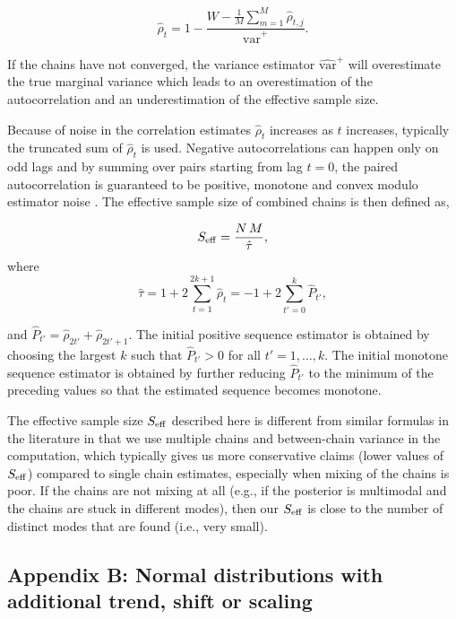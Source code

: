 \documentclass[american,]{article}
\theoremstyle{definition}
\begin{document}
\begin{equation}
\hat{\rho}_t
= 1 - \frac{\displaystyle W - \textstyle \frac{1}{M}\sum_{m=1}^M 
\hat{\rho}_{t,j}}{\widehat{\mbox{var}}^{+}}. \label{rhohat}
\end{equation}

If the chains have not converged, the variance estimator
\(\widehat{\mbox{var}}^{+}\) will overestimate the true marginal
variance which leads to an overestimation of the autocorrelation and an
underestimation of the effective sample size.

Because of noise in the correlation estimates \(\hat{\rho}_t\) increases
as \(t\) increases, typically the truncated sum of \(\hat{\rho}_t\) is
used. Negative autocorrelations can happen only on odd lags and by
summing over pairs starting from lag \(t=0\), the paired autocorrelation
is guaranteed to be positive, monotone and convex modulo estimator noise
\citep{Geyer:1992, Geyer:2011}. The effective sample size of combined
chains is then defined as,

\begin{equation}
S_{\rm eff} = \frac{N \, M}{\hat{\tau}},
\end{equation} where \begin{equation}
\hat{\tau} = 1 + 2 \sum_{t=1}^{2k+1} \hat{\rho}_t = 
-1 + 2 \sum_{t'=0}^{k} \hat{P}_{t'},
\end{equation}

and \(\hat{P}_{t'}=\hat{\rho}_{2t'}+\hat{\rho}_{2t'+1}\). The initial
positive sequence estimator is obtained by choosing the largest \(k\)
such that \(\hat{P}_{t'}>0\) for all \(t' = 1,\ldots,k\). The initial
monotone sequence estimator is obtained by further reducing
\(\hat{P}_{t'}\) to the minimum of the preceding values so that the
estimated sequence becomes monotone.

The effective sample size \(S_{\rm eff}\) described here is different
from similar formulas in the literature in that we use multiple chains
and between-chain variance in the computation, which typically gives us
more conservative claims (lower values of \(S_{\rm eff}\)) compared to
single chain estimates, especially when mixing of the chains is poor. If
the chains are not mixing at all (e.g., if the posterior is multimodal and
the chains are stuck in different modes), then our \(S_{\rm eff}\) is
close to the number of distinct modes that are found (i.e., very small).



\hypertarget{AppendixD}{%
\subsection*{Appendix B: Normal distributions with additional trend,
shift or scaling}\label{AppendixD}}
\end{document}
